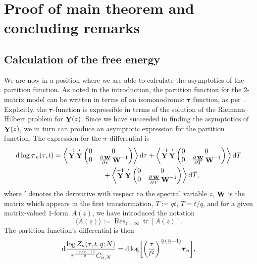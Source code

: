\documentclass[pdftex]{sigma}
\DeclareMathOperator{\tr}{tr}
\DeclareMathOperator*{\Ress}{Res}
\newcommand{\Res}{\displaystyle\Ress}
\DeclareMathOperator{\YY}{{\bf Y}}
\DeclareMathOperator{\WW}{{\bf W}}
\numberwithin{equation}{section}
\begin{document}
\section{Proof of main theorem and concluding remarks}\label{section7}
\subsection{Calculation of the free energy}
We are now in a position where we are able to calculate the asymptotics of the partition function. As noted in the introduction, the partition function for the 2-matrix model can be written in terms of an isomonodromic $\boldsymbol{\tau}$ function, as per~\cite{Bertola-Marchal}. Explicitly,
the $\boldsymbol{\tau}$-function is expressible in terms of the solution of the Riemann--Hilbert problem for $\YY(z)$. Since we have succeeded in
finding the asymptotics of $\YY(z)$, we in turn can produce an asymptotic expression for the partition function. The expression for the $\boldsymbol{\tau}$-differential is
 \begin{gather}
 {\rm d}\log \boldsymbol{\tau}_n(\tau,t) = \left\langle \YY^{-1}\YY'
 \begin{pmatrix}
 0 & 0\\
 0 & \frac{\partial \WW} {\partial \tau} \WW^{-1}
 \end{pmatrix}\right\rangle {\rm d}\tau
 + \left\langle \YY^{-1}\YY' \begin{pmatrix}
 0 & 0\\
 0 & \frac{\partial \WW }{\partial T} \WW^{-1}
 \end{pmatrix}\right\rangle {\rm d}T \nonumber\\
 \hphantom{{\rm d}\log \boldsymbol{\tau}_n(\tau,t) = }{}
 + \left\langle \YY^{-1}\YY' \begin{pmatrix}
 0 & 0\\
 0 & \frac{\partial \WW }{\partial \bar{T}} \WW^{-1}
 \end{pmatrix}\right\rangle {\rm d}\bar{T},\label{tau-diff-1}
 \end{gather}
where $'$ denotes the derivative with respect to the spectral variable $z$, $\WW$ is the matrix which appears in the first transformation, $T := qt$, $\bar{T} = t/q$, and
for a given matrix-valued $1$-form~$A(z)$, we have introduced the notation
 \begin{equation*}
 \langle A(z) \rangle := \Res_{z=\infty} \tr \left[ A(z) \right].
 \end{equation*}
The partition function's differential is then
 \begin{equation*}
 {\rm d}\frac{\log Z_{n}(\tau,t,q;N)}{\tau^{\frac{-n(n-1)}{2}}C_{n,N}} = {\rm d}\log\biggl[\biggl(\frac{\tau}{t^2}\biggr)^{\frac{n}{2}(\frac{n}{3}-1)} \boldsymbol{\tau}_n \biggr],
 \end{equation*}
\end{document}
